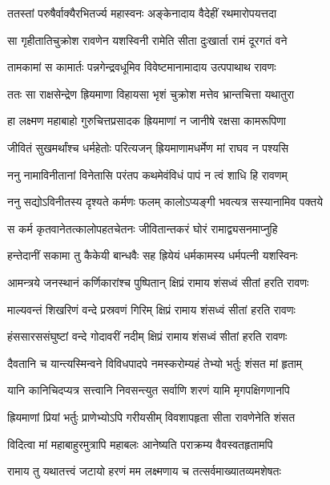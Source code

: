 \twolineshloka
{ततस्तां परुषैर्वाक्यैरभितर्ज्य महास्वनः}
{अङ्केनादाय वैदेहीं रथमारोपयत्तदा} %

\twolineshloka
{सा गृहीतातिचुक्रोश रावणेन यशस्विनी}
{रामेति सीता दुःखार्ता रामं दूरगतं वने} %

\twolineshloka
{तामकामां स कामार्तः पन्नगेन्द्रवधूमिव}
{विवेष्टमानामादाय उत्पपाथाथ रावणः} %

\twolineshloka
{ततः सा राक्षसेन्द्रेण ह्रियमाणा विहायसा}
{भृशं चुक्रोश मत्तेव भ्रान्तचित्ता यथातुरा} %

\twolineshloka
{हा लक्ष्मण महाबाहो गुरुचित्तप्रसादक}
{ह्रियमाणां न जानीषे रक्षसा कामरूपिणा} %

\twolineshloka
{जीवितं सुखमर्थांश्च धर्महेतोः परित्यजन्}
{ह्रियमाणामधर्मेण मां राघव न पश्यसि} %

\twolineshloka
{ननु नामाविनीतानां विनेतासि परंतप}
{कथमेवंविधं पापं न त्वं शाधि हि रावणम्} %

\twolineshloka
{ननु सद्योऽविनीतस्य दृश्यते कर्मणः फलम्}
{कालोऽप्यङ्गी भवत्यत्र सस्यानामिव पक्तये} %

\twolineshloka
{स कर्म कृतवानेतत्कालोपहतचेतनः}
{जीवितान्तकरं घोरं रामाद्व्यसनमाप्नुहि} %

\twolineshloka
{हन्तेदानीं सकामा तु कैकेयी बान्धवैः सह}
{ह्रियेयं धर्मकामस्य धर्मपत्नी यशस्विनः} %

\twolineshloka
{आमन्त्रये जनस्थानं कर्णिकारांश्च पुष्पितान्}
{क्षिप्रं रामाय शंसध्वं सीतां हरति रावणः} %

\twolineshloka
{माल्यवन्तं शिखरिणं वन्दे प्रस्रवणं गिरिम्}
{क्षिप्रं रामाय शंसध्वं सीतां हरति रावणः} %

\twolineshloka
{हंससारससंघुष्टां वन्दे गोदावरीं नदीम्}
{क्षिप्रं रामाय शंसध्वं सीतां हरति रावणः} %

\twolineshloka
{दैवतानि च यान्त्यस्मिन्वने विविधपादपे}
{नमस्करोम्यहं तेभ्यो भर्तुः शंसत मां हृताम्} %

\twolineshloka
{यानि कानिचिदप्यत्र सत्त्वानि निवसन्त्युत}
{सर्वाणि शरणं यामि मृगपक्षिगणानपि} %

\twolineshloka
{ह्रियमाणां प्रियां भर्तुः प्राणेभ्योऽपि गरीयसीम्}
{विवशापहृता सीता रावणेनेति शंसत} %

\twolineshloka
{विदित्वा मां महाबाहुरमुत्रापि महाबलः}
{आनेष्यति पराक्रम्य वैवस्वतहृतामपि} %

\twolineshloka
{रामाय तु यथातत्त्वं जटायो हरणं मम}
{लक्ष्मणाय च तत्सर्वमाख्यातव्यमशेषतः} %


